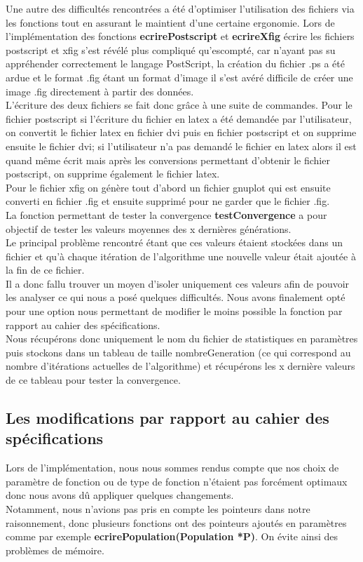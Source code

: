 \documentclass[a4paper,11pt]{article}
\begin{document}
			Une autre des difficultés rencontrées a été d'optimiser l'utilisation des fichiers via les fonctions tout en assurant le maintient d'une certaine ergonomie.
			Lors de l'implémentation des fonctions \textbf{ecrirePostscript} et  \textbf{ecrireXfig} écrire les fichiers postscript et xfig s’est révélé plus compliqué qu’escompté, car n’ayant pas su appréhender correctement le langage PostScript, la création du fichier .ps a été ardue et le format .fig étant un format d’image il s’est avéré difficile de créer une image .fig directement à partir des données.\\
			L’écriture des deux fichiers se fait donc grâce à une suite de commandes. Pour le fichier postscript si l'écriture du fichier en latex a été demandée par l’utilisateur, on convertit le fichier latex en fichier dvi puis en fichier postscript et on supprime ensuite le fichier dvi; si l'utilisateur n’a pas demandé le fichier en latex alors il est quand même écrit mais après les conversions permettant d’obtenir le fichier postscript, on supprime également le fichier latex.\\
			Pour le fichier xfig on génère tout d’abord un fichier gnuplot qui est ensuite converti en fichier .fig et ensuite supprimé pour ne garder que le fichier .fig.\\

			La fonction permettant de tester la convergence \textbf{testConvergence} a pour objectif de tester les valeurs moyennes des x dernières générations.\\
			Le principal problème rencontré étant que ces valeurs étaient stockées dans un fichier et qu’à chaque itération de l’algorithme une nouvelle valeur était ajoutée à la fin de ce fichier.\\
			Il a donc fallu trouver un moyen d’isoler uniquement ces valeurs afin de pouvoir les analyser ce qui nous a posé quelques difficultés. Nous avons finalement opté pour une option nous permettant de modifier le moins possible la fonction par rapport au cahier des spécifications.\\
			Nous récupérons donc uniquement le nom du fichier de statistiques en paramètres puis stockons dans un tableau de taille nombreGeneration (ce qui correspond au nombre d’itérations actuelles de l’algorithme) et récupérons les x dernière valeurs de ce tableau pour tester la convergence.\\

		\subsection{Les modifications par rapport au cahier des spécifications}
			Lors de l’implémentation, nous nous sommes rendus compte que nos choix de paramètre de fonction ou de type de fonction n’étaient pas forcément optimaux donc nous avons dû appliquer quelques changements.\\
   			Notamment, nous n’avions pas pris en compte les pointeurs dans notre raisonnement, donc plusieurs fonctions ont des pointeurs ajoutés en paramètres comme par exemple \textbf{ecrirePopulation(Population *P)}. On évite ainsi des problèmes de mémoire. \\
\end{document}
